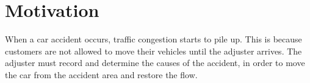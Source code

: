 \section{Motivation}
When a car accident occurs,
traffic congestion starts to pile up.
This is because
customers are not allowed
to move their vehicles until
the adjuster arrives.
The adjuster must record and determine
the causes of the accident,
in order to
move the car from the accident area
and restore the flow.
